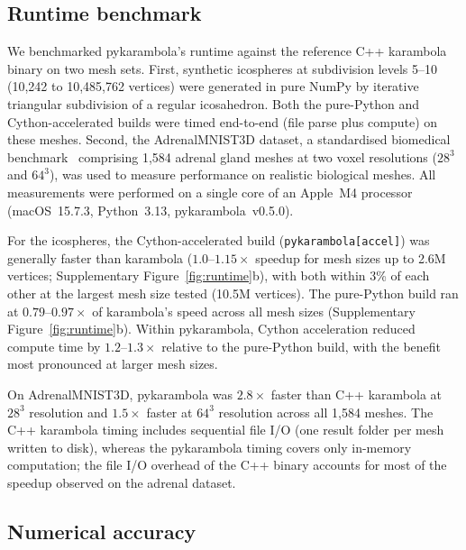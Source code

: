 \documentclass[times, twoside, watermark]{zHenriquesLab-StyleBioRxiv}
\newcommand{\newtxt}[1]{#1}
\newcommand{\added}[2][]{#2}        %
\newcommand{\newtxt}[1]{\textcolor{chgadded}{#1}}
\renewcommand{\added}[2][]{\newtxt{#2}}  %
\begin{document}
\subsection*{Runtime benchmark}

We benchmarked pykarambola\added{'s runtime} against the reference C++ karambola binary on two mesh sets.
First, synthetic icospheres at subdivision levels 5--10 (10{,}242 to 10{,}485{,}762 vertices) were generated in pure NumPy by iterative triangular subdivision of a regular icosahedron.
Both the pure-Python and Cython-accelerated builds were timed end-to-end (file parse plus compute) on these meshes.
Second, the AdrenalMNIST3D dataset, a standardised biomedical benchmark~\cite{Yang2023MedMNIST} comprising 1{,}584 adrenal gland meshes at two voxel resolutions ($28^3$ and $64^3$), was used to measure performance on realistic biological meshes.
All measurements were performed on a single core of an Apple~M4 processor (macOS~15.7.3, Python~3.13, pykarambola~v0.5.0).

For the icospheres, the Cython-accelerated build (\texttt{pykarambola[accel]}) was
generally faster than karambola ($1.0$--$1.15\times$ speedup for mesh sizes
up to 2.6M vertices; Supplementary Figure~\ref{fig:runtime}b), with both within 3\% of
each other at the largest mesh size tested (10.5M vertices).
The pure-Python build ran at $0.79$--$0.97\times$ of karambola's speed
across all mesh sizes (Supplementary Figure~\ref{fig:runtime}b).
Within pykarambola, Cython acceleration reduced compute time by
$1.2$--$1.3\times$ relative to the pure-Python build, with the benefit most
pronounced at larger mesh sizes.

On AdrenalMNIST3D, pykarambola was $2.8\times$ faster than C++
karambola at $28^3$ resolution and $1.5\times$ faster at $64^3$
resolution across all 1{,}584 meshes.
The C++ karambola timing includes sequential file I/O (one result folder
per mesh written to disk), whereas the pykarambola timing covers only
in-memory computation; the file I/O overhead of the C++ binary accounts for most
of the speedup observed on the adrenal dataset.

\subsection*{Numerical accuracy}
\end{document}
